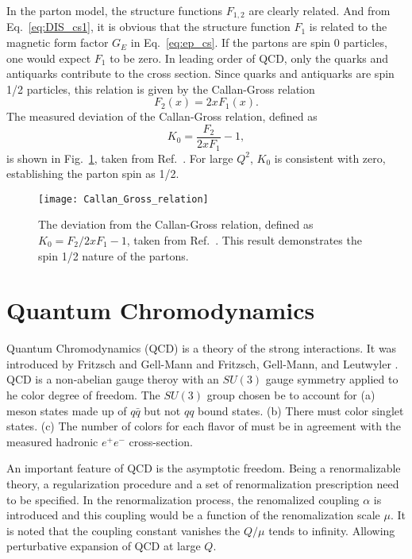 In the parton model, the structure functions $F_{1,2}$ are clearly related. And
from Eq.\ \ref{eq:DIS_cs1}, it is obvious that the structure function $F_1$ is 
related to the magnetic form factor $G_E$ in Eq.\ \ref{eq:ep_cs}. If the partons
are spin 0 particles, one would expect $F_1$ to be zero. In leading order of QCD,
only the quarks and antiquarks contribute to the cross section. Since quarks and 
antiquarks are spin 1/2 particles, this relation is given by the Callan-Gross 
relation\cite{callan1968,callan1969}
\begin{equation}
F_2\left(x\right) = 2x F_1\left(x\right).
\end{equation}
The measured deviation of the Callan-Gross relation, defined as 
\begin{equation}
K_0 = \frac{F_2}{2xF_1}-1,
\end{equation}
is shown in Fig.\ \ref{fig:callan_gross}, taken from Ref.\ \cite{kendall1991}. 
For large $Q^2$, $K_0$ is consistent with zero, establishing the parton spin as
1/2.
\begin{figure}[htbp!]
\centering
\texttt{[image: Callan\_Gross\_relation]}
\caption{The deviation from the Callan-Gross relation, defined as 
	$K_0=F_2/2xF_1 -1$, taken from Ref.\ \cite{kendall1991}. This result
	demonstrates the spin 1/2 nature of the partons.}
\label{fig:callan_gross}
\end{figure}

\section{Quantum Chromodynamics}
\label{sec:QCD}
Quantum Chromodynamics (QCD) is a theory of the strong interactions. It was 
introduced by Fritzsch and Gell-Mann \cite{fritzsch1972} and Fritzsch, Gell-Mann,
and Leutwyler \cite{fritzsch1973}. QCD is a non-abelian gauge theroy with an 
$SU(3)$ gauge symmetry applied to he color degree of freedom. The $SU(3)$ group 
chosen be to account for (a) meson states made up of $q\bar{q}$ but not $qq$ bound states.
(b) There must color singlet states. (c) The number of colors for each flavor of
must be in agreement with the measured hadronic $e^+ e^-$ cross-section.


An important feature of QCD is the asymptotic freedom. Being a renormalizable 
theory, a regularization procedure and a set of renormalization prescription 
need to be specified. In the renormalization process, the renomalized coupling $\alpha$
is introduced and this coupling would be a function of the renomalization scale $\mu$.
It is noted that the coupling constant vanishes the $Q/\mu$ tends to infinity. 
Allowing perturbative expansion of QCD at large $Q$. 


